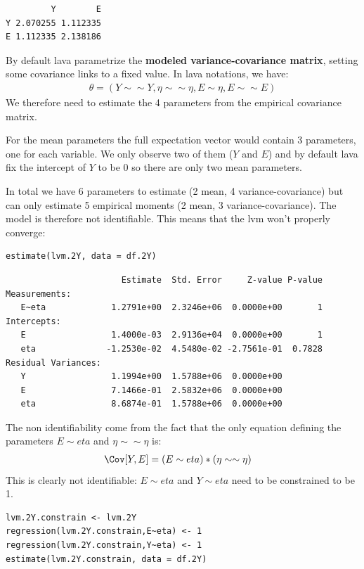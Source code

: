 \documentclass{article}
\begin{document}
\begin{verbatim}
         Y        E
Y 2.070255 1.112335
E 1.112335 2.138186
\end{verbatim}


By default lava parametrize the \textbf{modeled variance-covariance matrix},
setting some covariance links to a fixed value. In lava notations, we
have:
\begin{align*}
\theta = \left(Y \sim\sim Y, \eta \sim\sim \eta, E \sim \eta, E \sim\sim E\right)
\end{align*}
We therefore need to estimate the 4 parameters from the empirical
covariance matrix.

For the mean parameters the full expectation vector would contain 3
parameters, one for each variable. We only observe two of them (\(Y\)
and \(E\)) and by default lava fix the intercept of \(Y\) to be 0 so
there are only two mean parameters. 

In total we have 6 parameters to estimate (2 mean, 4
variance-covariance) but can only estimate 5 empirical moments (2
mean, 3 variance-covariance). The model is therefore not identifiable.
This means that the lvm won't properly converge:
\lstset{language=r,label= ,caption= ,captionpos=b,numbers=none}
\begin{lstlisting}
estimate(lvm.2Y, data = df.2Y)
\end{lstlisting}

\begin{verbatim}
                       Estimate  Std. Error     Z-value P-value
Measurements:                                                  
   E~eta             1.2791e+00  2.3246e+06  0.0000e+00       1
Intercepts:                                                    
   E                 1.4000e-03  2.9136e+04  0.0000e+00       1
   eta              -1.2530e-02  4.5480e-02 -2.7561e-01  0.7828
Residual Variances:                                            
   Y                 1.1994e+00  1.5788e+06  0.0000e+00        
   E                 7.1466e-01  2.5832e+06  0.0000e+00        
   eta               8.6874e-01  1.5788e+06  0.0000e+00
\end{verbatim}

The non identifiability come from the fact that the only equation
defining the parameters \(E \sim eta\) and \(\eta \sim \sim \eta\) is:
\begin{align*}
\Cov[Y,E] &= (E \sim eta) * (\eta \sim \sim \eta)
\end{align*}
This is clearly not identifiable: \(E \sim eta\) and \(Y \sim eta\) need to be constrained to be 1.
\lstset{language=r,label= ,caption= ,captionpos=b,numbers=none}
\begin{lstlisting}
lvm.2Y.constrain <- lvm.2Y
regression(lvm.2Y.constrain,E~eta) <- 1
regression(lvm.2Y.constrain,Y~eta) <- 1
estimate(lvm.2Y.constrain, data = df.2Y)
\end{lstlisting}
\end{document}
